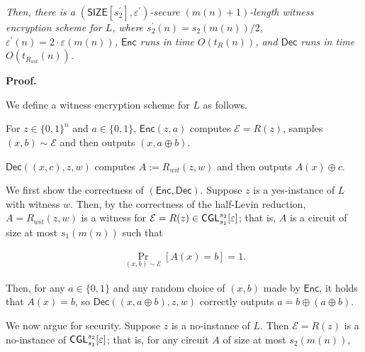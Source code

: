 \documentclass[10pt,a4paper]{article}
\begin{document}
\emph{Then, there is a $({\mathsf{SIZE}}[s_{2}^{\prime}],\varepsilon^{\prime})$-secure $(m(n)+1)$-length witness encryption scheme for $L$, where $s_{2}^{\prime}(n)=s_{2}(m(n))/2$, $\varepsilon^{\prime}(n)=2\cdot\varepsilon(m(n))$, ${\mathsf{Enc}}$ runs in time $O(t_{R}(n))$, and ${\mathsf{Dec}}$ runs in time $O(t_{R_{wit}}(n))$.}\par







\par\medskip\noindent\textbf{Proof.}\par




We define a witness encryption scheme for $L$ as follows.\par



For $z\in\{0,1\}^{n}$ and $a\in\{0,1\}$, ${\mathsf{Enc}}(z,a)$ computes $\mathcal{E}=R(z)$, samples $(x,b)\sim\mathcal{E}$ and then outputs $(x,a\oplus b)$.\par




${\mathsf{Dec}}((x,c),z,w)$ computes $A:=R_{wit}(z,w)$ and then outputs $A(x)\oplus c$.\par





We first show the correctness of $({\mathsf{Enc}},{\mathsf{Dec}})$. Suppose $z$ is a yes-instance of $L$ with witness $w$. Then, by the correctness of the half-Levin reduction, $A=R_{wit}(z,w)$ is a witness for $\mathcal{E}=R(z)\in{\sf CGL}_{s_{1}}^{s_{2}}[\varepsilon]$; that is, $A$ is a circuit of size at most $s_{1}(m(n))$ such that\par


\[\begin{gathered}
\Pr_{(x,b)\sim\mathcal{E}}[A(x)=b]=1.
\end{gathered}\]


Then, for any $a\in\{0,1\}$ and any random choice of $(x,b)$ made by ${\mathsf{Enc}}$, it holds that $A(x)=b$, so ${\mathsf{Dec}}((x,a\oplus b),z,w)$ correctly outputs $a=b\oplus(a\oplus b)$.\par




We now argue for security. Suppose $z$ is a no-instance of $L$. Then $\mathcal{E}=R(z)$ is a no-instance of ${\sf CGL}_{s_{1}}^{s_{2}}[\varepsilon]$; that is, for any circuit $A$ of size at most $s_{2}(m(n))$,\par
\end{document}
